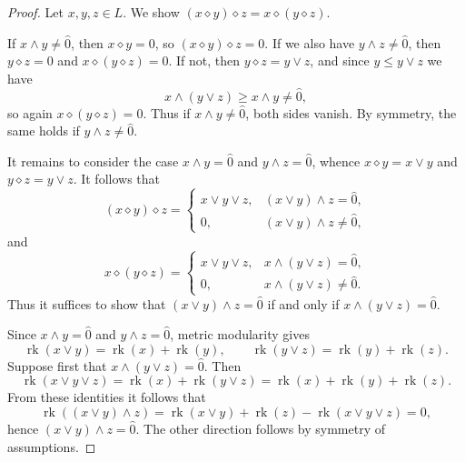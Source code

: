 \documentclass[10pt,a4paper]{amsart}
\DeclareMathOperator{\rk}{rk}
\begin{document}
\begin{proof}
Let $x,y,z\in L$. We show $(x\diamond y)\diamond z = x\diamond (y\diamond z)$.

If $x\wedge y\neq \hat 0$, then $x\diamond y=0$, so $(x\diamond y)\diamond z=0$.
If we also have $y\wedge z\neq \hat 0$, then $y\diamond z=0$ and
$x\diamond (y\diamond z)=0$. If not, then
$y\diamond z=y\vee z$, and since $y\le y\vee z$ we have
\[
x\wedge (y\vee z)\ge x\wedge y\neq \hat 0,
\]
so again $x\diamond (y\diamond z)=0$. Thus if $x\wedge y\neq \hat 0$, both sides vanish. By symmetry, the same holds if $y\wedge z\neq \hat 0$.

It remains to consider the case $x\wedge y=\hat 0$ and $y\wedge z=\hat 0$, whence $x\diamond y=x\vee y$ and $y\diamond z=y\vee z$.
It follows that
\[
(x\diamond y)\diamond z=
\begin{cases}
x\vee y\vee z,& (x\vee y)\wedge z=\hat 0,\\
0,& (x\vee y)\wedge z\neq \hat 0,
\end{cases}
\]
and
\[
x\diamond (y\diamond z)=
\begin{cases}
x\vee y\vee z,& x\wedge (y\vee z)=\hat 0,\\
0,& x\wedge (y\vee z)\neq \hat 0.
\end{cases}
\]
Thus it suffices to show that $(x\vee y)\wedge z=\hat 0$ if and only if $x\wedge (y\vee z)=\hat 0$.


Since $x\wedge y=\hat 0$ and $y\wedge z=\hat 0$, metric modularity gives
\[
\rk(x\vee y)= \rk(x)+\rk(y),
\qquad
\rk(y\vee z)=\rk(y)+\rk(z).
\]
Suppose first that $x\wedge (y\vee z)=\hat 0$. Then
\[
\rk(x\vee y\vee z)=\rk(x)+\rk(y\vee z) = \rk(x)+\rk(y)+\rk(z).
\]
From these identities it follows that
\[
\rk((x\vee y)\wedge z)
=
\rk(x\vee y)+\rk(z)-\rk(x\vee y\vee z)=0,
\]
hence $(x\vee y)\wedge z=\hat 0$. The other direction follows by symmetry of assumptions. \qedhere
\end{proof}
\end{document}
